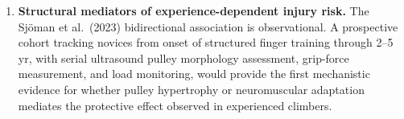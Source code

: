 \begin{enumerate}[leftmargin=2em]
  \item \textbf{Structural mediators of experience-dependent injury risk.} The Sjöman et al.\ (2023) bidirectional association is observational. A prospective cohort tracking novices from onset of structured finger training through 2--5\,yr, with serial ultrasound pulley morphology assessment, grip-force measurement, and load monitoring, would provide the first mechanistic evidence for whether pulley hypertrophy or neuromuscular adaptation mediates the protective effect observed in experienced climbers.
\end{enumerate}
